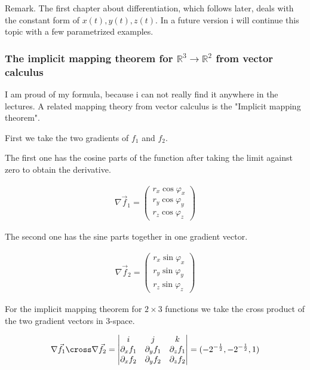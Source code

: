 \documentclass[a4paper]{article}
\begin{document}
Remark. The first chapter about differentiation, which follows later, deals with the constant form of $x(t), y(t), z(t)$. In a future version i will continue this topic with a few parametrized examples.\\



\subsubsection{The implicit mapping theorem for $\mathbb{R}^{3} \rightarrow \mathbb{R}^{2}$ from vector calculus}

I am proud of my formula, because i can not really find it anywhere in the lectures. A related mapping theory from
vector calculus is the "Implicit mapping theorem".

First we take the two gradients of $f_1$ and $f_2$.

The first one has the cosine parts of the function after taking the limit against zero to obtain the derivative.


\begin{displaymath}
\begin{align}
	\nabla\vec{f}_{1} = \begin{pmatrix}r_x \cos \varphi_x\\r_y \cos \varphi_y\\r_z \cos \varphi_z \end{pmatrix}
\end{align}
\end{displaymath}

The second one has the sine parts together in one gradient vector.

\begin{displaymath}
\begin{align}
	\nabla\vec{f}_{2} = \begin{pmatrix}r_x \sin \varphi_x\\r_y \sin \varphi_y\\r_z \sin \varphi_z \end{pmatrix}
\end{align}
\end{displaymath}



For the implicit mapping theorem for $2 \times 3$ functions we take the cross product of the two gradient vectors in 3-space.

\begin{displaymath}
\begin{align}
	\nabla\vec{f}_{1} \cross \nabla\vec{f}_{2} = \begin{vmatrix}i&j&k\\
	\partial_{x}f_{1}&\partial_{y}f_{1}&\partial_{z}f_{1}\\
	\partial_{x}f_{2}&\partial_{y}f_{2}&\partial_{z}f_{2}\\
	\end{vmatrix} = (-2^{-\frac12}, -2^{-\frac12}, 1)
\end{align}
\end{displaymath}
\end{document}
